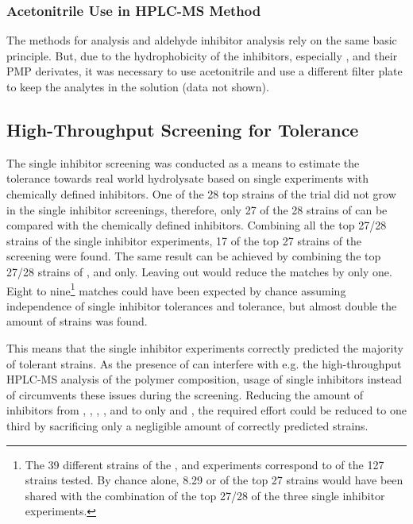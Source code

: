 \subsubsection{Acetonitrile Use in HPLC-MS Method}
The methods for \amc{} analysis and aldehyde inhibitor analysis rely on the same basic principle. But, due to the hydrophobicity of the inhibitors, especially \fur{}, and their PMP derivates, it was necessary to use acetonitrile and use a different filter plate to keep the analytes in the solution (data not shown).

\subsection{High-Throughput Screening for \LCH{} Tolerance\label{subsec-lch-eps-disc-lch-tol}}
The single inhibitor screening was conducted as a means to estimate the tolerance towards real world hydrolysate based on single experiments with chemically defined inhibitors. One of the 28 top strains of the \lch{} trial did not grow in the single inhibitor screenings, therefore, only 27 of the 28 strains of \lch{} can be compared with the chemically defined inhibitors. %
Combining all the top 27/28 strains of the single inhibitor experiments, 17 of the top 27 strains of the \lch{} screening were found. The same result can be achieved by combining the top 27/28 strains of \acet{}, \van{} and \hmf{} only. Leaving out \hmf{} would reduce the matches by only one. Eight to nine\footnote{The 39 different strains of the \acet{}, \van{} and \hmf{} experiments correspond to  of the 127 strains tested. By chance alone, \num{8.29} or  of the top 27 strains would have been shared with the combination of the top 27/28 of the three single inhibitor experiments.} matches could have been expected by chance assuming independence of single inhibitor tolerances and \lch{} tolerance, but almost double the amount of strains was found.

This means that the single inhibitor experiments correctly predicted the majority of \lch{} tolerant strains. As the presence of \lch{} can interfere with e.g. the high-throughput HPLC-MS analysis of the polymer composition, usage of single inhibitors instead of \lch{} circumvents these issues during the screening. Reducing the amount of inhibitors from \fur{}, \hmf{}, \van{}, \acet{}, \fora{} and \laev{} to only \van{} and \acet{}, the required effort could be reduced to one third by sacrificing only a negligible amount of correctly predicted strains.

